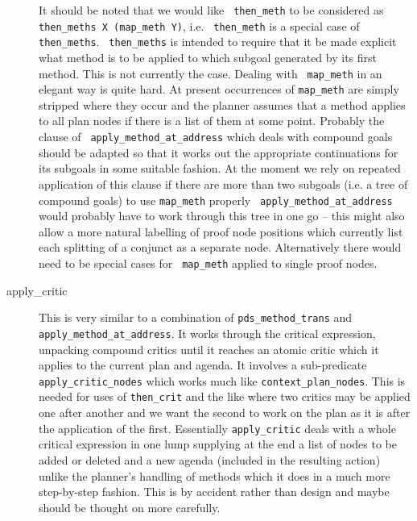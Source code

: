 \begin{description}
  It should be noted that we would like {\tt
    then\_meth} to be considered as {\tt then\_meths
    X (map\_meth Y)}, i.e. {\tt
    then\_meth} is a special case of {\tt then\_meths}.  {\tt
    then\_meths} is intended to require that it be made explicit what
  method is to be applied to which subgoal generated by its first
  method.  This is not currently the case.  Dealing with {\tt
    map\_meth} in an elegant way is quite hard.  At present
  occurrences of {\tt map\_meth} are simply stripped where they occur
  and the planner assumes that a method applies to all plan nodes if
  there is a list of them at some point.  Probably the clause of {\tt
    apply\_method\_at\_address}
  which deals with compound goals should be
  adapted so that it works out the appropriate continuations for its
  subgoals in some suitable fashion.  At the moment we rely on
  repeated application of this clause if there are more than two
  subgoals (i.e. a tree of compound goals) to use {\tt map\_meth}
  properly {\tt
    apply\_method\_at\_address}
  would probably have to work through this tree in one go -- this
  might also allow a more natural labelling of proof node positions
  which currently list each splitting of a conjunct as a separate
  node.  Alternatively there would need to be special cases for {\tt
    map\_meth} applied to single proof nodes.
  
\item[apply\_critic\index{apply\_critic}] This is very similar to a
  combination of {\tt pds\_method\_trans}
  and {\tt
    apply\_method\_at\_address}.  It
  works through the critical expression,
  unpacking compound critics until it reaches
  an atomic critic which it applies to the
  current plan and agenda.  It involves a sub-predicate {\tt
    apply\_critic\_nodes} which works much
  like {\tt context\_plan\_nodes}.  This
  is needed for uses of {\tt then\_crit} and the
  like where two critics may be applied one after another and we want
  the second to work on the plan as it is after the application of the
  first.  Essentially {\tt apply\_critic} deals with a whole critical
  expression in one lump supplying at the end a list of nodes to be
  added or deleted and a new agenda (included in the resulting
  action) unlike the planner's handling of methods which
  it does in a much more step-by-step fashion.  This is by accident
  rather than design and maybe should be thought on more carefully.


\end{description}

